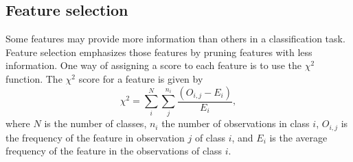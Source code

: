 \subsection{Feature selection}
Some features may provide more information than others in a classification task. Feature selection emphasizes those features by pruning features with less information. One way of assigning a score to each feature is to use the $\chi^2$ function. The $\chi^2$ score for a feature is given by
\[
\chi^2 = \sum_i^N \sum_j^{n_i} \frac{\left ( O_{i,j} - E_i \right )}{E_i},
\]
where $N$ is the number of classes, $n_i$ the number of observations in class $i$, $O_{i,j}$ is the frequency of the feature in observation $j$ of class $i$, and $E_i$ is the average frequency of the feature in the observations of class $i$. 